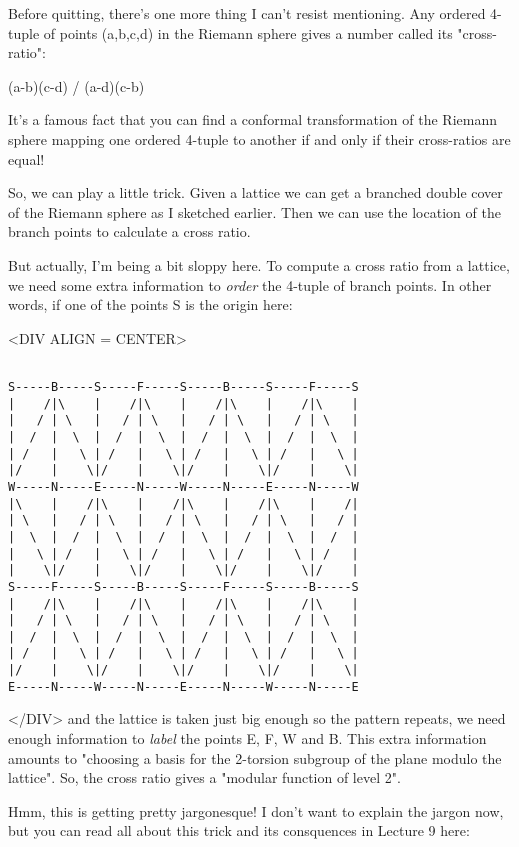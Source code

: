 Before quitting, there's one more thing I can't resist mentioning.
Any ordered 4-tuple of points (a,b,c,d) in the Riemann sphere gives 
a number called its "cross-ratio":

(a-b)(c-d) / (a-d)(c-b)

It's a famous fact that you can find a conformal transformation of
the Riemann sphere mapping one ordered 4-tuple to another if and 
only if their cross-ratios are equal!  

So, we can play a little trick.   Given a lattice we can get a 
branched double cover of the Riemann sphere as I sketched earlier.
Then we can use the location of the branch points to calculate a cross 
ratio.  

But actually, I'm being a bit sloppy here.  To compute a cross ratio 
from a lattice, we need some extra information to \emph{order} the 4-tuple 
of branch points.  In other words, if one of the points S is the origin
here:

<DIV ALIGN = CENTER>

\begin{verbatim}

S-----B-----S-----F-----S-----B-----S-----F-----S
|    /|\    |    /|\    |    /|\    |    /|\    |
|   / | \   |   / | \   |   / | \   |   / | \   |
|  /  |  \  |  /  |  \  |  /  |  \  |  /  |  \  |
| /   |   \ | /   |   \ | /   |   \ | /   |   \ |
|/    |    \|/    |    \|/    |    \|/    |    \|
W-----N-----E-----N-----W-----N-----E-----N-----W
|\    |    /|\    |    /|\    |    /|\    |    /|
| \   |   / | \   |   / | \   |   / | \   |   / |
|  \  |  /  |  \  |  /  |  \  |  /  |  \  |  /  |
|   \ | /   |   \ | /   |   \ | /   |   \ | /   |
|    \|/    |    \|/    |    \|/    |    \|/    |
S-----F-----S-----B-----S-----F-----S-----B-----S
|    /|\    |    /|\    |    /|\    |    /|\    |
|   / | \   |   / | \   |   / | \   |   / | \   |
|  /  |  \  |  /  |  \  |  /  |  \  |  /  |  \  |
| /   |   \ | /   |   \ | /   |   \ | /   |   \ |
|/    |    \|/    |    \|/    |    \|/    |    \|
E-----N-----W-----N-----E-----N-----W-----N-----E
\end{verbatim}
    
</DIV>
and the lattice is taken just big enough so the pattern 
repeats, we need enough information to \emph{label}
the points E, F, W and B.  This extra information amounts to 
"choosing a basis for the 2-torsion subgroup of the plane modulo 
the lattice".  So, the cross ratio gives a "modular function
of level 2".  

Hmm, this is getting pretty jargonesque!  I don't want to explain the
jargon now, but you can read all about this trick and its consquences 
in Lecture 9 here:

